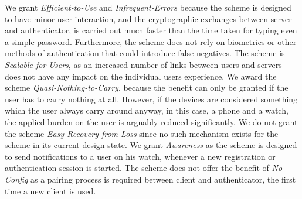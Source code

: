 We grant \textit{Efficient-to-Use} and \textit{Infrequent-Errors} because the scheme is designed to have minor user interaction, and the cryptographic exchanges between \gls{server} and \gls{authenticator}, is carried out much faster than the time taken for typing even a simple password. Furthermore, the scheme does not rely on biometrics or other methods of authentication that could introduce false-negatives. The scheme is \textit{Scalable-for-Users}, as an increased number of links between users and \glspl{server} does not have any impact on the individual users experience. We award the scheme \textit{Quasi-Nothing-to-Carry}, because the benefit can only be granted if the user has to carry nothing at all. However, if the devices are considered something which the user always carry around anyway, in this case, a phone and a watch, the applied burden on the user is arguably reduced significantly. We do not grant the scheme \textit{Easy-Recovery-from-Loss} since no such mechanism exists for the scheme in its current design state. 
We grant \textit{Awareness} as the scheme is designed to send notifications to a user on his watch, whenever a new registration or authentication session is started. The scheme does not offer the benefit of \textit{No-Config} as a pairing process is required between \gls{client} and \gls{authenticator}, the first time a new \gls{client} is used. 


